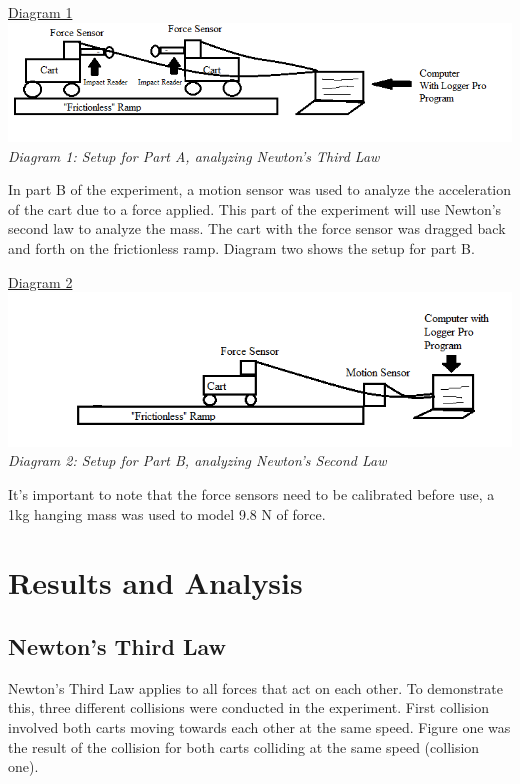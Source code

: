 \documentclass[aps,letterpaper,11pt]{revtex4}
\begin{document}
\begin{center}
\underline{Diagram 1}\\
\includegraphics[width=6in]{SetupPartA.png}\\
\textit{Diagram 1: Setup for Part A, analyzing Newton's Third Law}\\
\end{center}

In part B of the experiment, a motion sensor was used to analyze the acceleration of the cart due to a force applied. This part of the experiment will use Newton's second law to analyze the mass. The cart with the force sensor was dragged back and forth on the frictionless ramp. Diagram two shows the setup for part B.

\begin{center}
\underline{Diagram 2}\\
\includegraphics[width=6in]{SetupPartB.png}\\
\textit{Diagram 2: Setup for Part B, analyzing Newton's Second Law}
\end{center}

It's important to note that the force sensors need to be calibrated before use, a 1kg hanging mass was used to model 9.8 N of force.


\section{Results and Analysis}

\subsection{Newton's Third Law}

Newton's Third Law applies to all forces that act on each other. To demonstrate this, three different collisions were conducted in the experiment. First collision involved both carts moving towards each other at the same speed. Figure one was the result of the collision for both carts colliding at the same speed (collision one).
\end{document}

